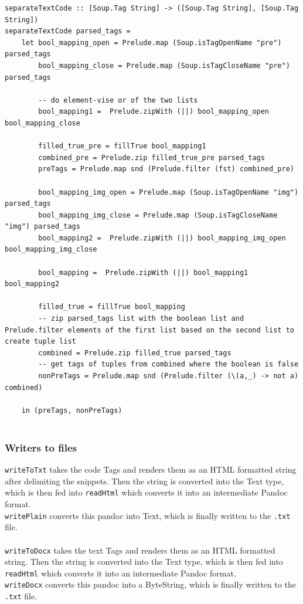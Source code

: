 \documentclass{scrreprt}
\begin{document}
\begin{verbatim}
separateTextCode :: [Soup.Tag String] -> ([Soup.Tag String], [Soup.Tag String])
separateTextCode parsed_tags =
    let bool_mapping_open = Prelude.map (Soup.isTagOpenName "pre") parsed_tags
        bool_mapping_close = Prelude.map (Soup.isTagCloseName "pre") parsed_tags

        -- do element-vise or of the two lists
        bool_mapping1 =  Prelude.zipWith (||) bool_mapping_open bool_mapping_close

        filled_true_pre = fillTrue bool_mapping1
        combined_pre = Prelude.zip filled_true_pre parsed_tags
        preTags = Prelude.map snd (Prelude.filter (fst) combined_pre)

        bool_mapping_img_open = Prelude.map (Soup.isTagOpenName "img") parsed_tags
        bool_mapping_img_close = Prelude.map (Soup.isTagCloseName "img") parsed_tags
        bool_mapping2 =  Prelude.zipWith (||) bool_mapping_img_open bool_mapping_img_close

        bool_mapping =  Prelude.zipWith (||) bool_mapping1 bool_mapping2

        filled_true = fillTrue bool_mapping
        -- zip parsed_tags list with the boolean list and Prelude.filter elements of the first list based on the second list to create tuple list
        combined = Prelude.zip filled_true parsed_tags
        -- get tags of tuples from combined where the boolean is false
        nonPreTags = Prelude.map snd (Prelude.filter (\(a,_) -> not a) combined)

    in (preTags, nonPreTags)


\end{verbatim}


\subsubsection{Writers to files}
\texttt{writeToTxt} takes the code Tags and renders them as an HTML formatted string after delimiting the snippets. Then the string is converted into the Text type, which is then fed into \texttt{readHtml} which converts it into an intermediate Pandoc format.\\ \texttt{writePlain} converts this pandoc into Text, which is finally written to the \texttt{.txt} file. \\
\\ \texttt{writeToDocx} takes the text Tags and renders them as an HTML formatted string. Then the string is converted into the Text type, which is then fed into \texttt{readHtml} which converts it into an intermediate Pandoc format.\\ \texttt{writeDocx} converts this pandoc into a ByteString, which is finally written to the \texttt{.txt} file. 
\end{document}
